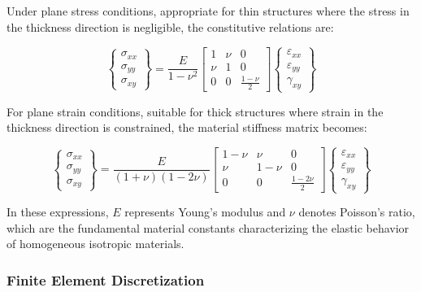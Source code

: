 \documentclass[12pt,a4paper]{report}
\begin{document}
Under plane stress conditions, appropriate for thin structures where the stress in the thickness direction is negligible, the constitutive relations are:

\begin{equation}
\begin{Bmatrix} 
\sigma_{xx} \\ 
\sigma_{yy} \\ 
\sigma_{xy} 
\end{Bmatrix} 
= \frac{E}{1-\nu^2} 
\begin{bmatrix} 
1 & \nu & 0 \\ 
\nu & 1 & 0 \\ 
0 & 0 & \frac{1-\nu}{2} 
\end{bmatrix} 
\begin{Bmatrix} 
\varepsilon_{xx} \\ 
\varepsilon_{yy} \\ 
\gamma_{xy} 
\end{Bmatrix}
\end{equation}

For plane strain conditions, suitable for thick structures where strain in the thickness direction is constrained, the material stiffness matrix becomes:

\begin{equation}
\begin{Bmatrix} 
\sigma_{xx} \\ 
\sigma_{yy} \\ 
\sigma_{xy} 
\end{Bmatrix} 
= \frac{E}{(1+\nu)(1-2\nu)} 
\begin{bmatrix} 
1-\nu & \nu & 0 \\ 
\nu & 1-\nu & 0 \\ 
0 & 0 & \frac{1-2\nu}{2} 
\end{bmatrix} 
\begin{Bmatrix} 
\varepsilon_{xx} \\ 
\varepsilon_{yy} \\ 
\gamma_{xy} 
\end{Bmatrix}
\end{equation}

In these expressions, $E$ represents Young's modulus and $\nu$ denotes Poisson's ratio, which are the fundamental material constants characterizing the elastic behavior of homogeneous isotropic materials.

\subsubsection{Finite Element Discretization}
\end{document}
